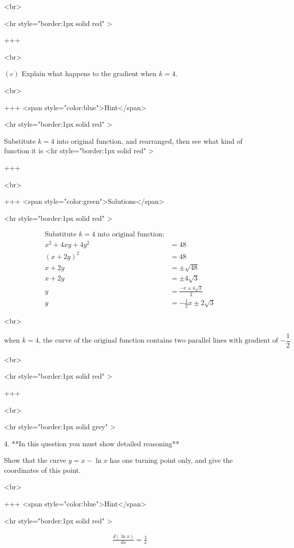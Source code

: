 <br>

<hr style="border:1px solid red" >

+++

<br>

\((c)\) Explain what happens to the gradient when $k=4$.

<br>

+++ <span style="color:blue">Hint</span>

<hr style="border:1px solid red" >

Substitute $k=4$ into original function, and rearranged, then see what kind of function it is
<hr style="border:1px solid red" >

+++

<br>

+++ <span style="color:green">Solutions</span>

<hr style="border:1px solid red" >

$$
\begin{aligned}
\text{Substitute $k=4$ into original function:}\\
x^2+4 x y+4 y^2&=48 \\
(x+2 y)^2&=48 \\
x+2 y&= \pm \sqrt{48} \\
x+2 y &= \pm 4 \sqrt{3} \\
y&=\frac{-x \pm 4 \sqrt{3}}{2} \\
y&=-\frac{1}{2} x \pm 2 \sqrt{3}
\end{aligned}
$$

<br>

$$
\text{when $k=4$, the curve of the original function contains two parallel lines with gradient of $-\frac{1}{2}$}
$$

<br>

<hr style="border:1px solid red" >

+++

<br>

<hr style="border:1px solid grey" >

4. **In this question you must show detailed reasoning**

Show that the curve $y=x-\ln x$ has one turning point only, and give the coordinates of this point.

<br>

+++ <span style="color:blue">Hint</span>

<hr style="border:1px solid red" >

$$
\begin{aligned}
\frac{d(\ln x)}{dx}=\frac{1}{x}
\end{aligned}
$$

